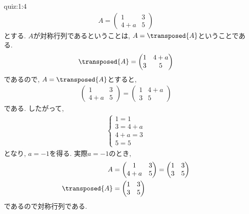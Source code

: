 \begin{answerof}{quiz:1:4}
  \begin{align*}
    A=
    \begin{pmatrix}
      1& 3\\
      4+a &5
    \end{pmatrix}
  \end{align*}
  とする.  $A$が対称行列であるということは, $A=\transposed{A}$ということである.
  \begin{align*}
    \transposed{A}=
    \begin{pmatrix}
      1& 4+a\\
      3 &5
    \end{pmatrix}
  \end{align*}
  であるので, $A=\transposed{A}$とすると,
  \begin{align*}
    \begin{pmatrix}
      1& 3\\
      4+a &5
    \end{pmatrix}
=
    \begin{pmatrix}
      1& 4+a\\
      3 &5
    \end{pmatrix}
  \end{align*}
  である.
  したがって, 
  \begin{align*}
    \begin{cases}
      1=1\\
      3=4+a\\
      4+a=3\\
      5=5
    \end{cases}
  \end{align*}
  となり, $a=-1$を得る.
  実際$a=-1$のとき,
  \begin{align*}
    A&=
    \begin{pmatrix}
      1& 3\\
      4+a &5
    \end{pmatrix}=
    \begin{pmatrix}
      1& 3\\
      3 &5
    \end{pmatrix}\\
    \transposed{A}&=
    \begin{pmatrix}
      1& 3\\
      3 &5
    \end{pmatrix}
  \end{align*}
  であるので対称行列である.
\end{answerof}



